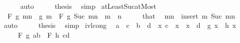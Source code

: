 \begin{isabellebody}
\ \ \ \ \isamarkupfalse%
\ auto\isanewline
\ \ \isamarkupfalse%
\ \isamarkupfalse%
\ {\isacharquery}{\kern0pt}thesis\ \isamarkupfalse%
\ simp\isanewline
{}\isamarkupfalse%
%
\endisatagproof
{\isafoldproof}%
%
\isadelimproof
\isanewline
%
\endisadelimproof
\isanewline
{}\isamarkupfalse%
\ atLeast{\isacharunderscore}{\kern0pt}Suc{\isacharunderscore}{\kern0pt}atMost{\isacharcolon}{\kern0pt}\isanewline
\ \ {\isachardoublequoteopen}F\ g\ {\isacharbraceleft}{\kern0pt}m{\isachardot}{\kern0pt}{\isachardot}{\kern0pt}n{\isacharbraceright}{\kern0pt}\ {\isacharequal}{\kern0pt}\ g\ m\ \isactrlbold {\isacharasterisk}{\kern0pt}\ F\ g\ {\isacharbraceleft}{\kern0pt}Suc\ m{\isachardot}{\kern0pt}{\isachardot}{\kern0pt}n{\isacharbraceright}{\kern0pt}{\isachardoublequoteclose}\ \ {\isachardoublequoteopen}m\ {\isasymle}\ n{\isachardoublequoteclose}\isanewline
%
\isadelimproof
%
\endisadelimproof
%
\isatagproof
{}\isamarkupfalse%
\ {\isacharminus}{\kern0pt}\isanewline
\ \ \isamarkupfalse%
\ that\ \isamarkupfalse%
\ {\isachardoublequoteopen}{\isacharbraceleft}{\kern0pt}m{\isachardot}{\kern0pt}{\isachardot}{\kern0pt}n{\isacharbraceright}{\kern0pt}\ {\isacharequal}{\kern0pt}\ insert\ m\ {\isacharbraceleft}{\kern0pt}Suc\ m{\isachardot}{\kern0pt}{\isachardot}{\kern0pt}n{\isacharbraceright}{\kern0pt}{\isachardoublequoteclose}\isanewline
\ \ \ \ \isamarkupfalse%
\ auto\isanewline
\ \ \isamarkupfalse%
\ \isamarkupfalse%
\ {\isacharquery}{\kern0pt}thesis\ \isamarkupfalse%
\ simp\isanewline
{}\isamarkupfalse%
%
\endisatagproof
{\isafoldproof}%
%
\isadelimproof
\isanewline
%
\endisadelimproof
\isanewline
{}\isamarkupfalse%
\ ivl{\isacharunderscore}{\kern0pt}cong{\isacharcolon}{\kern0pt}\isanewline
\ \ {\isachardoublequoteopen}a\ {\isacharequal}{\kern0pt}\ c\ {\isasymLongrightarrow}\ b\ {\isacharequal}{\kern0pt}\ d\ {\isasymLongrightarrow}\ {\isacharparenleft}{\kern0pt}{\isasymAnd}x{\isachardot}{\kern0pt}\ c\ {\isasymle}\ x\ {\isasymLongrightarrow}\ x\ {\isacharless}{\kern0pt}\ d\ {\isasymLongrightarrow}\ g\ x\ {\isacharequal}{\kern0pt}\ h\ x{\isacharparenright}{\kern0pt}\isanewline
\ \ \ \ {\isasymLongrightarrow}\ F\ g\ {\isacharbraceleft}{\kern0pt}a{\isachardot}{\kern0pt}{\isachardot}{\kern0pt}{\isacharless}{\kern0pt}b{\isacharbraceright}{\kern0pt}\ {\isacharequal}{\kern0pt}\ F\ h\ {\isacharbraceleft}{\kern0pt}c{\isachardot}{\kern0pt}{\isachardot}{\kern0pt}{\isacharless}{\kern0pt}d{\isacharbraceright}{\kern0pt}{\isachardoublequoteclose}\isanewline

\end{isabellebody}
